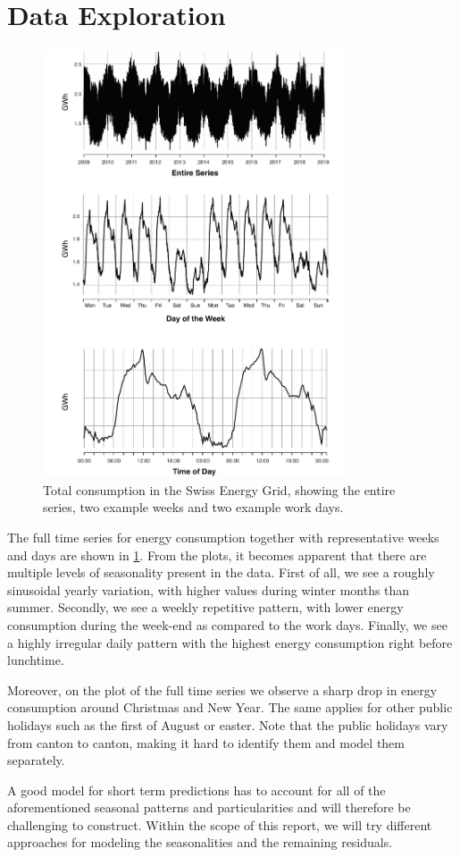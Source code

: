 \documentclass[conference]{IEEEtran}
\begin{document}
\section{Data Exploration}
\begin{figure}[ht]
	\centering
	\includegraphics[width=0.8\textwidth]{Figs/Fig1.pdf}
	\caption{Total consumption in the Swiss Energy Grid, showing the entire series, two example weeks and two example work days.}
	\label{SeriesPlot}
\end{figure}
The full time series for energy consumption together with representative weeks and days are shown in \ref{SeriesPlot}. From the plots, it becomes apparent that there are multiple levels of seasonality present in the data. First of all, we see a roughly sinusoidal yearly variation, with higher values during winter months than summer. Secondly, we see a weekly repetitive pattern, with lower energy consumption during the week-end as compared to the work days. Finally, we see a highly irregular daily pattern with the highest energy consumption right before lunchtime.
\par
Moreover, on the plot of the full time series we observe a sharp drop in energy consumption around Christmas and New Year. The same applies for other public holidays such as the first of August or  easter. Note that the public holidays vary from canton to canton, making it hard to identify them and model them separately. 
\par
A good model for short term predictions has to account for all of the aforementioned seasonal patterns and particularities and will therefore be challenging to construct. Within the scope of this report, we will try different approaches for modeling the seasonalities and the remaining residuals. 
\par



\begin{thebibliography}{00}

\item
\end{thebibliography}
\end{document}
